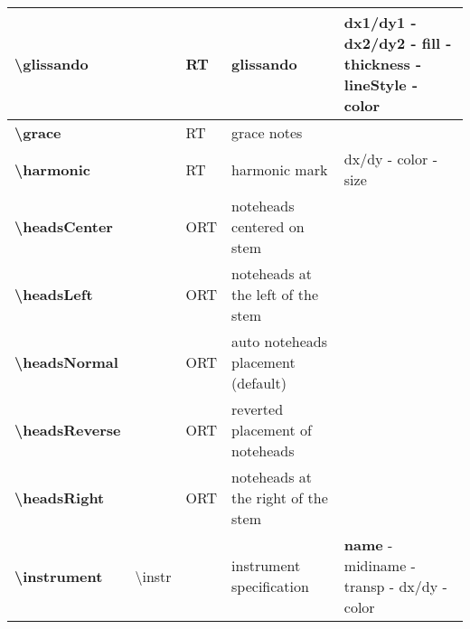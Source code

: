 \documentclass[a4paper, landscape, 10pt]{article}
\begin{document}
\begin{tabularx}{\linewidth}{p{3cm}p{4.5cm}p{3cm}p{5.5cm}l}
    \hline
    \textbf{\textbackslash{}glissando}&&RT&glissando&dx1/dy1 - dx2/dy2 - fill - thickness - lineStyle - color\\
    \hline
    \textbf{\textbackslash{}grace}&&RT&grace notes&\\
    \hline
    \textbf{\textbackslash{}harmonic}&&RT&harmonic mark&dx/dy - color - size\\
    \hline
    \textbf{\textbackslash{}headsCenter}&&ORT&noteheads centered on stem&\\
    \hline
    \textbf{\textbackslash{}headsLeft}&&ORT&noteheads at the left of the stem&\\
    \hline
    \textbf{\textbackslash{}headsNormal}&&ORT&auto noteheads placement (default)&\\
    \hline
    \textbf{\textbackslash{}headsReverse}&&ORT&reverted placement of noteheads&\\
    \hline
    \textbf{\textbackslash{}headsRight}&&ORT&noteheads at the right of the stem&\\
    \hline
    \textbf{\textbackslash{}instrument}&\textbackslash{}instr&&instrument specification&\textbf{name} - midiname - transp - dx/dy - color\\
    \hline
\end{tabularx}
%
%
\end{document}
